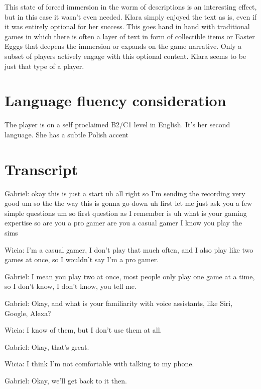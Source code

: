 This state of forced immersion in the worm of descriptions is an interesting effect, but in this case it wasn't even needed. Klara simply enjoyed the text as is, even if it was entirely optional for her success. This goes hand in hand with traditional games in which there is often a layer of text in form of collectible items or Easter Egggs that deepens the immersion or expands on the game narrative. Only a subset of players actively engage with this optional content. Klara seems to be just that type of a player.



\section{Language fluency consideration}


The player is on a self proclaimed B2/C1 level in English. It's her second language. She has a subtle Polish accent

\section{Transcript}

Gabriel: okay this is just a start uh all right so I'm sending the recording very good um so the the way this is gonna go down uh first let me just ask you a few simple questions um so first question as I remember is uh what is your gaming expertise so are you a pro gamer are you a casual gamer I know you play the sims

Wicia: I'm a casual gamer, I don't play that much often, and I also play like two games at once, so I wouldn't say I'm a pro gamer.

Gabriel: I mean you play two at once, most people only play one game at a time, so I don't know, I don't know, you tell me.

Gabriel: Okay, and what is your familiarity with voice assistants, like Siri, Google, Alexa?

Wicia: I know of them, but I don't use them at all.

Gabriel: Okay, that's great.

Wicia: I think I'm not comfortable with talking to my phone.

Gabriel: Okay, we'll get back to it then.

